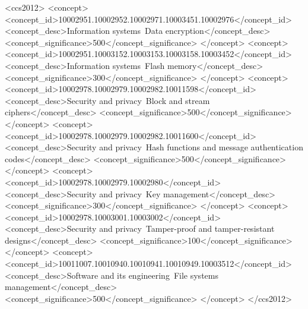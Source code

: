 \documentclass[sigplan,10pt]{acmart}\settopmatter{}
\begin{document}
\author{Henry Hoffmann}





\begin{CCSXML}
<ccs2012>
<concept>
<concept_id>10002951.10002952.10002971.10003451.10002976</concept_id>
<concept_desc>Information systems~Data encryption</concept_desc>
<concept_significance>500</concept_significance>
</concept>
<concept>
<concept_id>10002951.10003152.10003153.10003158.10003452</concept_id>
<concept_desc>Information systems~Flash memory</concept_desc>
<concept_significance>300</concept_significance>
</concept>
<concept>
<concept_id>10002978.10002979.10002982.10011598</concept_id>
<concept_desc>Security and privacy~Block and stream ciphers</concept_desc>
<concept_significance>500</concept_significance>
</concept>
<concept>
<concept_id>10002978.10002979.10002982.10011600</concept_id>
<concept_desc>Security and privacy~Hash functions and message authentication codes</concept_desc>
<concept_significance>500</concept_significance>
</concept>
<concept>
<concept_id>10002978.10002979.10002980</concept_id>
<concept_desc>Security and privacy~Key management</concept_desc>
<concept_significance>300</concept_significance>
</concept>
<concept>
<concept_id>10002978.10003001.10003002</concept_id>
<concept_desc>Security and privacy~Tamper-proof and tamper-resistant designs</concept_desc>
<concept_significance>100</concept_significance>
</concept>
<concept>
<concept_id>10011007.10010940.10010941.10010949.10003512</concept_id>
<concept_desc>Software and its engineering~File systems management</concept_desc>
<concept_significance>500</concept_significance>
</concept>
</ccs2012>
\end{CCSXML}

\end{document}
